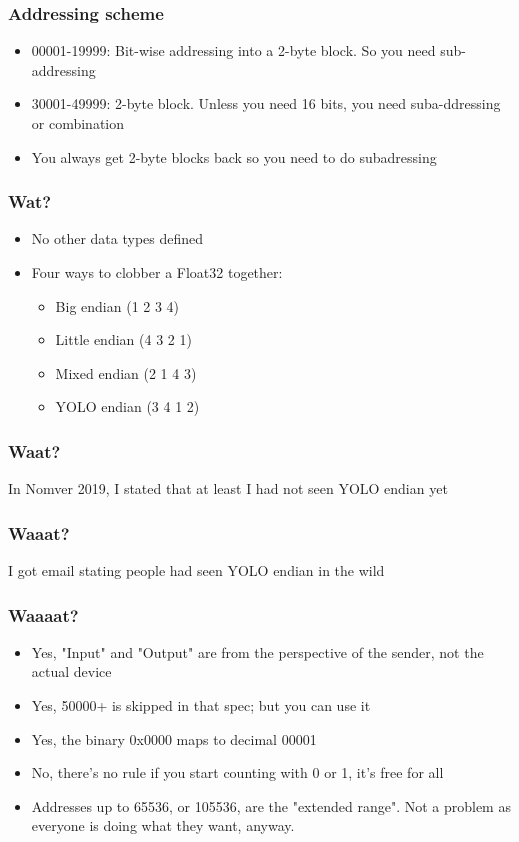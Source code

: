 \documentclass[aspectratio=169]{beamer}
\begin{document}
\begin{frame}
	\frametitle{Addressing scheme}
	\begin{itemize}
		\item 00001-19999: Bit-wise addressing into a 2-byte block. So you need sub-addressing
		\item 30001-49999: 2-byte block. Unless you need 16 bits, you need suba-ddressing or combination
		\item You always get 2-byte blocks back so you need to do subadressing
	\end{itemize}
\end{frame}

\begin{frame}
	\frametitle{Wat?}
	\begin{itemize}
		\item No other data types defined
		\item Four ways to clobber a Float32 together:
		\begin{itemize}
			\item Big endian (1 2 3 4)
			\item Little endian (4 3 2 1)
			\item Mixed endian (2 1 4 3)
			\item YOLO endian (3 4 1 2)
		\end{itemize}
	\end{itemize}
\end{frame}

\begin{frame}
	\frametitle{Waat?}
	\centering
	\vfill
	In Nomver 2019, I stated that at least I had not seen YOLO endian yet
	\vfill
\end{frame}

\begin{frame}
	\frametitle{Waaat?}
	\centering
	\vfill
	I got email stating people had seen YOLO endian in the wild
	\vfill
\end{frame}

\begin{frame}
	\frametitle{Waaaat?}
	\begin{itemize}
		\item Yes, "Input" and "Output" are from the perspective of the sender, not the actual device
		\item Yes, 50000+ is skipped in that spec; but you can use it
		\item Yes, the binary 0x0000 maps to decimal 00001
		\item No, there's no rule if you start counting with 0 or 1, it's free for all
		\item Addresses up to 65536, or 105536, are the "extended range". Not a problem as everyone is doing what they want, anyway.
	\end{itemize}
\end{frame}
\end{document}
